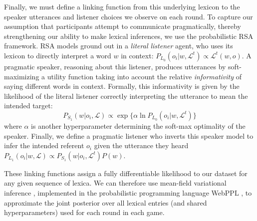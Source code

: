 \documentclass[10pt,letterpaper]{article}
\begin{document}
Finally, we must define a linking function from this underlying lexicon to the speaker utterances and listener choices we observe on each round. To capture our assumption that participants attempt to communicate pragmatically, thereby strengthening our ability to make lexical inferences, we use the probabilistic RSA framework. RSA models ground out in a \emph{literal listener} agent, who uses its lexicon to directly interpret a word $w$ in context: $P_{L_0}(o_i | w, \mathcal{L}^t) \propto \mathcal{L}^t(w,o)$. A pragmatic speaker, reasoning about this listener, produces utterances by soft-maximizing a utility function taking into account the relative \emph{informativity} of saying different words in context. Formally, this informativity is given by the likelihood of the literal listener correctly interpreting the utterance to mean the intended target: $$P_{S_1}(w | o_i, \mathcal{L}) \propto \exp\{\alpha \ln P_{L_0}(o_i | w, \mathcal{L}^t)\}$$
where $\alpha$ is another hyperparameter determining the soft-max optimality of the speaker. Finally, we define a pragmatic listener who inverts this speaker model to infer the intended referent $o_i$ given the utterance they heard $P_{L_1}(o_i | w, \mathcal{L}) \propto P_{S_1}(w | o_i, \mathcal{L}^t) P(w)$.

These linking functions assign a fully differentiable likelihood to our dataset for any given sequence of lexica. We can therefore use mean-field variational inference \cite{RanganathGerrishBlei13_BlackBoxVariationalInference}, implemented in the probabilistic programming language WebPPL \cite{GoodmanStuhlmuller14_DIPPL}, to approximate the joint posterior over all lexical entries (and shared hyperparameters) used for each round in each game. 
\end{document}
